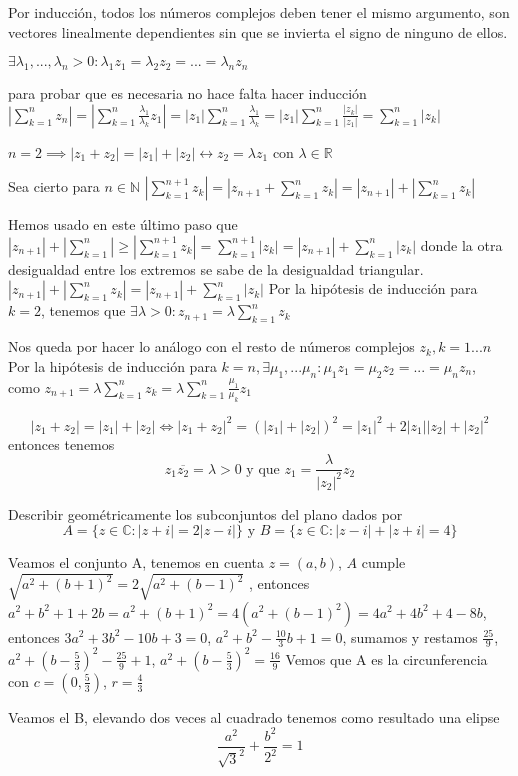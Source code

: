 \begin{sol}



Por inducción, todos los números complejos deben tener el mismo argumento, son vectores linealmente dependientes sin que se invierta el signo de ninguno de ellos.

$\exists\lambda_1,...,\lambda_n>0 : \lambda_1 z_1 = \lambda_2 z_2 = ... = \lambda_n z_n$

para probar que es necesaria no hace falta hacer inducción
$ |\sum_{k=1}^n z_n| = |\sum_{k=1}^n \frac{\lambda_1}{\lambda_k} z_1| 
=
|z_1|\sum_{k=1}^n \frac{\lambda_1}{\lambda_k} 
=
|z_1|\sum_{k=1}^n \frac{|z_k|}{|z_1|} 
=
\sum_{k=1}^n |z_k|$

$n=2 \implies |z_1+z_2| = |z_1| + |z_2| \longleftrightarrow z_2 = \lambda z_1$ con $\lambda \in \mathbb{R}$

Sea cierto para $n\in\mathbb{N}$
$|\sum_{k=1}^{n+1} z_k| 
=
|z_{n+1} + \sum_{k=1}^n z_k|
=
|z_{n+1}| + |\sum_{k=1}^n z_k|$

Hemos usado en este último paso que
$|z_{n+1}|+|\sum_{k=1}^n| \geq |\sum_{k=1}^{n+1} z_k|=\sum_{k=1}^{n+1} |z_k| = |z_{n+1}| + \sum_{k=1}^n |z_k|$
donde la otra desigualdad entre los extremos se sabe de la desigualdad triangular.
$|z_{n+1}| + |\sum_{k=1}^n z_k| 
=
|z_{n+1}| + \sum_{k=1}^n |z_k|$
Por la hipótesis de inducción para $k=2$, tenemos que 
$\exists \lambda >0 : z_{n+1} = \lambda \sum_{k=1}^n z_k$

Nos queda por hacer lo análogo con el resto de números complejos $z_k,k=1...n$
Por la hipótesis de inducción para $k=n, \exists \mu_1,...\mu_n : \mu_1 z_1 = \mu_2 z_2=...= \mu_n z_n$,
como $z_{n+1} = \lambda \sum_{k=1}^n z_k 
=
\lambda \sum_{k=1}^n \frac{\mu_1}{\mu_k} z_1$

$$ |z_1+z_2| = |z_1|+|z_2| 
\Longleftrightarrow
|z_1+z_2|^2 = (|z_1|+|z_2|)^2 
=
|z_1|^2 + 2|z_1||z_2|+|z_2|^2$$
 entonces tenemos
$$z_1 \overline{z_2}=\lambda>0 \text{ y que } z_1 = \frac{\lambda}{|z_2|^2 }z_2 
$$

\end{sol}

\begin{ejer}
	Describir geométricamente los subconjuntos del plano dados por
	$$ A=\{ z\in\mathbb{C} : |z+i|=2|z-i| \} \text{ y } B=\{ z\in\mathbb{C} : |z-i| + |z+i| = 4 \} $$
\end{ejer}

\begin{sol}


Veamos el conjunto A, tenemos en cuenta $z=(a,b)$,
$A$ cumple $ \sqrt{a^2+(b+1)^2} = 2\sqrt{a^2+(b-1)^2}$
, entonces $a^2+b^2+1+2 b = a^2+(b+1)^2 = 4(a^2+(b-1)^2) = 4a^2+4b^2+4-8b$, entonces
$3a^2+3b^2-10b+3=0$, $a^2+b^2-\frac{10}{3}b+1=0$, sumamos y restamos $\frac{25}{9}$, $a^2+(b-\frac{5}{3})^2-\frac{25}{9}+1$, 
$a^2+(b-\frac{5}{3})^2=\frac{16}{9}$
Vemos que A es la circunferencia con $c=(0, \frac{5}{3})$, $r=\frac{4}{3}$

Veamos el B, elevando dos veces al cuadrado tenemos como resultado una elipse
$$ \frac{a^2}{\sqrt{3}^2} + \frac{b^2}{2^2} = 1 $$
\end{sol}



